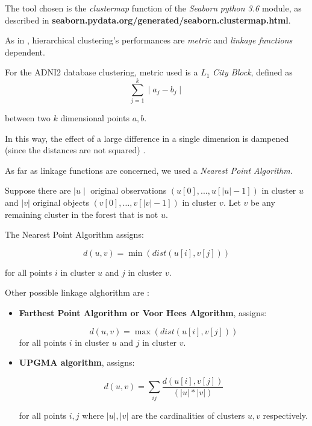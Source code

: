 \documentclass[12pt,openright,twoside,a4paper]{book}
\begin{document}
The tool chosen is the \textit{clustermap} function of the \textit{Seaborn} \textit{python 3.6} module, as described in \textbf{seaborn.pydata.org/generated/seaborn.clustermap.html}.
\vspace{5mm}

As in \cite{cluster2}, hierarchical clustering's performances are \textit{metric} and \textit{linkage functions} dependent.

For the ADNI2 database clustering, metric used is a $L_1$ \textit{City Block}, defined as 
\begin{equation}
\sum_{j=1}^k \mid a_j - b_j \mid 
\label{mcl}
\end{equation}

between two $k$ dimensional points $a,b$. 

In this way, the effect of a large difference in a single dimension is dampened (since the distances are not squared) \cite{cluster}.

As far as linkage functions are concerned, we used a \textit{Nearest Point Algorithm}. 
\vspace{5mm}

Suppose there are $\mid u\mid$ original observations $(u[0],..., u[|u|-1])$ in cluster $u$ and $|v|$ original objects $(v[0], \ldots, v[|v|-1])$ in cluster $v$. Let $v$ be any remaining cluster in the forest that is not $u$.

The Nearest Point Algorithm assigns:

\begin{equation}
d(u,v) = \min(dist(u[i],v[j]))
\end{equation}

for all points $i$ in cluster $u$ and $j$ in cluster $v$.

Other possible linkage alghorithm are \cite{cluster2}:

\begin{itemize}
\item \textbf{Farthest Point Algorithm or Voor Hees Algorithm}, assigns:

\begin{equation}
d(u, v) = \max(dist(u[i],v[j]))
\end{equation}
for all points $i$ in cluster $u$ and $j$ in cluster $v$.

\item \textbf{UPGMA algorithm}, assigns:

\begin{equation}
d(u,v) = \sum_{ij} \frac{d(u[i], v[j])}{(|u|*|v|)}
\end{equation}

for all points $i,j$ where $|u|,|v|$ are the cardinalities of clusters $u,v$ respectively.

\end{itemize}
\end{document}

